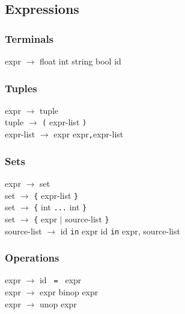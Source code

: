 \subsection{Expressions}
\subsubsection*{Terminals}
\begin{grammar}
expr $\to$ float \OR int \OR string \OR bool \OR id
\end{grammar}
\subsubsection*{Tuples}
\begin{grammar}
expr $\to$ tuple\\
tuple $\to$ \verb|(| expr-list \verb|)|\\
expr-list $\to$ expr \OR expr\verb|,|expr-list 
\end{grammar}
\subsubsection*{Sets}
\begin{grammar}
expr $\to$ set\\
set $\to$ \verb|{| expr-list \verb|}|\\
set $\to$ \verb|{| int \verb|...| int \verb|}|\\
set $\to$ \verb|{| expr $\vert$ source-list \verb|}|\\
source-list $\to$ id \verb|in| expr \OR id \verb|in| expr, source-list
\end{grammar}

\subsubsection*{Operations}
\begin{grammar}
expr $\to$ id \verb| = | expr\\
expr $\to$ expr binop expr\\
expr $\to$ unop expr\\
\end{grammar}


